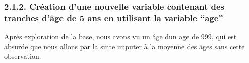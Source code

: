 \documentclass[
]{article}
\newenvironment{Shaded}{\begin{snugshade}}{\end{snugshade}}
\newcommand{\AttributeTok}[1]{\textcolor[rgb]{0.13,0.29,0.53}{#1}}
\newcommand{\ConstantTok}[1]{\textcolor[rgb]{0.56,0.35,0.01}{#1}}
\newcommand{\DecValTok}[1]{\textcolor[rgb]{0.00,0.00,0.81}{#1}}
\newcommand{\FunctionTok}[1]{\textcolor[rgb]{0.13,0.29,0.53}{\textbf{#1}}}
\newcommand{\NormalTok}[1]{#1}
\newcommand{\OtherTok}[1]{\textcolor[rgb]{0.56,0.35,0.01}{#1}}
\newcommand{\SpecialCharTok}[1]{\textcolor[rgb]{0.81,0.36,0.00}{\textbf{#1}}}
\begin{document}
\begin{Shaded}
\end{Shaded}

\hypertarget{cruxe9ation-dune-nouvelle-variable-contenant-des-tranches-duxe2ge-de-5-ans-en-utilisant-la-variable-age}{%
\subsubsection{2.1.2. Création d'une nouvelle variable contenant des
tranches d'âge de 5 ans en utilisant la variable
``age''}\label{cruxe9ation-dune-nouvelle-variable-contenant-des-tranches-duxe2ge-de-5-ans-en-utilisant-la-variable-age}}

Après exploration de la base, nous avons vu un âge dun age de 999, qui
est absurde que nous allons par la suite imputer à la moyenne des âges
sans cette observation.
\end{document}
